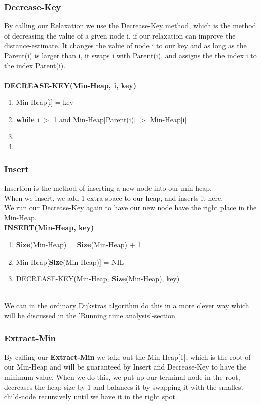 \documentclass[11pt]{article}
\begin{document}
\subsubsection{Decrease-Key}
By calling our Relaxation we use the Decrease-Key method, which is the method of decreasing the value of a given node i, if our relaxation can improve the distance-estimate. It changes the value of node i to our key and as long as the Parent(i) is larger than i, it swaps i with Parent(i), and assigns the the index i to the index Parent(i).\\\\

\textbf{DECREASE-KEY(Min-Heap, i, key)}
\begin{enumerate}
\setlength\itemsep{0em}
\item Min-Heap[i] = key
\item \textbf{while } i $>$ 1 and Min-Heap[Parent(i)] $>$ Min-Heap[i]
\item {}
\item {}
\end{enumerate}
\subsubsection{Insert}
Insertion is the method of inserting a new node into our min-heap.\\
When we insert, we add 1 extra space to our heap, and inserts it here.\\
We run our Decrease-Key again to have our new node have the right place in the Min-Heap.\\

\textbf{INSERT(Min-Heap, key)}
\begin{enumerate}
\setlength\itemsep{0em}
\item \textbf{Size}(Min-Heap) = \textbf{Size}(Min-Heap) + 1
\item Min-Heap[\textbf{Size}(Min-Heap)] = NIL
\item DECREASE-KEY(Min-Heap, \textbf{Size}(Min-Heap), key)
\end{enumerate}
\ \\
\noindent We can in the ordinary Dijkstras algorithm do this in a more clever way which will be discussed in the 'Running time analysis'-section
\subsubsection{Extract-Min}
By calling our \textbf{Extract-Min} we take out the Min-Heap[1], which is the root of our Min-Heap and will be guaranteed by Insert and Decrease-Key to have the minimum-value. When we do this, we put up our terminal node in the root, decreases the heap-size by 1 and balances it by swapping it with the smallest child-node recursively until we have it in the right spot.\\
\end{document}
